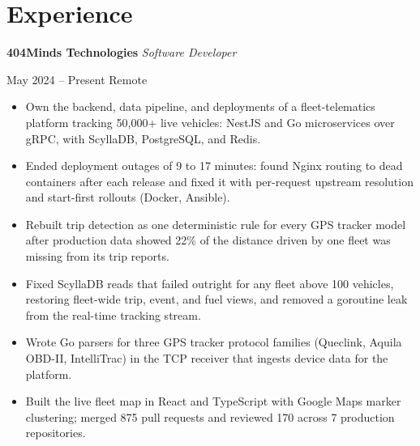\documentclass[letterpaper,11pt]{article}
\newcommand{\entry}[4]{%
  {\large\textbf{#1}} \textbar{} \textit{#2}\par
  {\small #3 \textbar{} #4}\par}
\begin{document}
\section{Experience}
\entry{404Minds Technologies}{Software Developer}{May 2024 -- Present}{Remote}
\begin{itemize}
  \item Own the backend, data pipeline, and deployments of a fleet-telematics platform tracking 50,000+ live
        vehicles: NestJS and Go microservices over gRPC, with ScyllaDB, PostgreSQL, and Redis.
  \item Ended deployment outages of 9 to 17 minutes: found Nginx routing to dead containers after each
        release and fixed it with per-request upstream resolution and start-first rollouts (Docker, Ansible).
  \item Rebuilt trip detection as one deterministic rule for every GPS tracker model after production data
        showed 22\% of the distance driven by one fleet was missing from its trip reports.
  \item Fixed ScyllaDB reads that failed outright for any fleet above 100 vehicles, restoring fleet-wide
        trip, event, and fuel views, and removed a goroutine leak from the real-time tracking stream.
  \item Wrote Go parsers for three GPS tracker protocol families (Queclink, Aquila OBD-II, IntelliTrac) in the
        TCP receiver that ingests device data for the platform.
  \item Built the live fleet map in React and TypeScript with Google Maps marker clustering; merged 875 pull
        requests and reviewed 170 across 7 production repositories.
\end{itemize}

\end{document}
